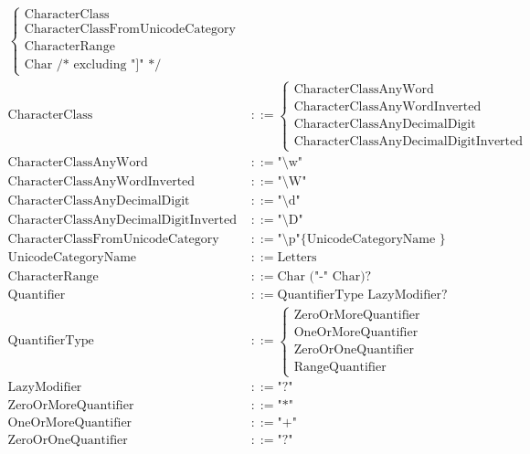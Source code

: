 \documentclass{article}
\begin{document}
\begin{align*}
\begin{cases}
											\text{CharacterClass} \\
											\text{CharacterClassFromUnicodeCategory} \\
											\text{CharacterRange} \\
											\text{Char} \text{ /* excluding "]" */}
										\end{cases} \\
		\text{CharacterClass} &::= \begin{cases}
										\text{CharacterClassAnyWord} \\
										\text{CharacterClassAnyWordInverted} \\
										\text{CharacterClassAnyDecimalDigit} \\
										\text{CharacterClassAnyDecimalDigitInverted}
									\end{cases} \\
		\text{CharacterClassAnyWord} 		 &::= \text{"\textbackslash w"} \\
		\text{CharacterClassAnyWordInverted} &::= \text{"\textbackslash W"} \\
		\text{CharacterClassAnyDecimalDigit} &::= \text{"\textbackslash d"} \\
		\text{CharacterClassAnyDecimalDigitInverted} &::= \text{"\textbackslash D"} \\
		\text{CharacterClassFromUnicodeCategory} 	 &::= \text{"\textbackslash p"\{ UnicodeCategoryName \}} \\
		\text{UnicodeCategoryName} 			&::= \text{Letters} \\
		\text{CharacterRange} 	&::= \text{Char ("-" Char)?} \\
		\text{Quantifier} 		&::= \text{QuantifierType LazyModifier?} \\
		\text{QuantifierType} 	&::= \begin{cases}
										\text{ZeroOrMoreQuantifier} \\
										\text{OneOrMoreQuantifier} \\
										\text{ZeroOrOneQuantifier} \\
										\text{RangeQuantifier}
									\end{cases} \\
		\text{LazyModifier} 		&::= \text{"?"} \\
		\text{ZeroOrMoreQuantifier} &::= \text{"*"} \\
		\text{OneOrMoreQuantifier}  &::= \text{"+"} \\
		\text{ZeroOrOneQuantifier}  &::= \text{"?"} \\

\end{align*}
\end{document}
